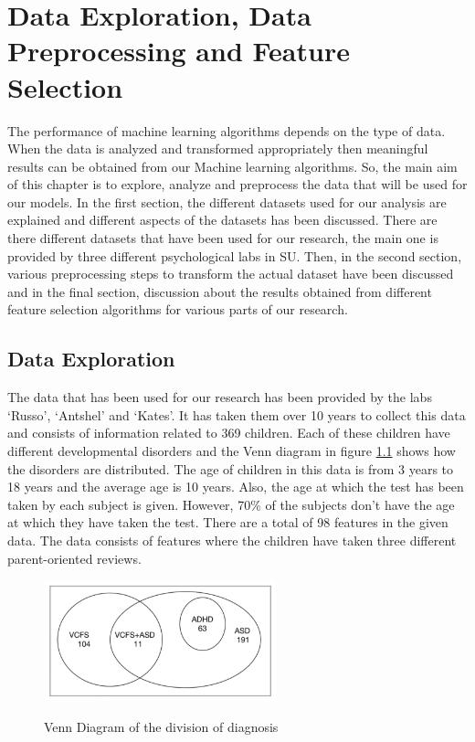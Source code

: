 
\chapter{Data Exploration, Data Preprocessing and Feature Selection}
\thispagestyle{plainbottom}
The performance of machine learning algorithms depends on the type of data. When the data is analyzed and transformed appropriately then meaningful results can be obtained from our Machine learning algorithms. So, the main aim of this chapter is to explore, analyze and preprocess the data that will be used for our models. In the first section, the different datasets used for our analysis are explained and different aspects of the datasets has been discussed. There are there different datasets that have been used for our research, the main one is provided by three different psychological labs in SU. Then, in the second section, various preprocessing steps to transform the actual dataset have been discussed and in the final section, discussion about the results obtained from different feature selection algorithms for various parts of our research.
\section{Data Exploration}
The data that has been used for our research has been provided by the labs `Russo', `Antshel' and `Kates'. It has taken them over 10 years to collect this data and consists of information related to 369 children. Each of these children have different developmental disorders and the Venn diagram in figure \ref{fig:Venn} shows how the disorders are distributed. The age of children in this data is from 3 years to 18 years and the average age is 10 years.  Also,  the age at which the test has been taken by each subject is given. However, 70\% of the subjects don't have the age at which 
they have taken the test. There are a total of 98 features in the given data. The data consists of features where the children have taken three different parent-oriented reviews. 

\begin{figure}
\centering
   {\includegraphics[width=0.6\textwidth]{Figures/Figure_3_1.png}}
  \caption{Venn Diagram of the division of diagnosis}
  \label{fig:Venn}
\end{figure}

